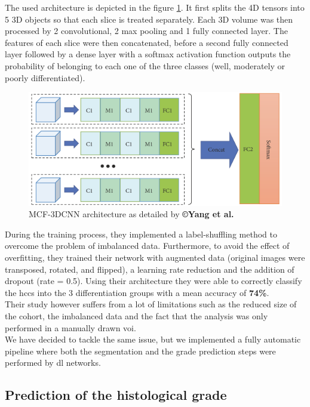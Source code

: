 The used architecture is depicted in the figure \ref{fig:Yang2019_Figure2_MCF-3DCNN}. It first splits the 4D
tensors into 5 3D objects so that each slice is treated separately. Each
3D volume was then processed by 2 convolutional, 2 max pooling and 1
fully connected layer. The features of each slice were then
concatenated, before a second fully connected layer followed by a dense
layer with a softmax activation function outputs the probability of
belonging to each one of the three classes (well, moderately or poorly differentiated).

\begin{figure}[th!]
\centering
\includegraphics[width=0.7\linewidth]{../HistologicalGradePrediction/images/Yang2019_Fig2}
\caption{MCF-3DCNN architecture as detailed by \textbf{©Yang et al. \cite{Yang2019}}}
\label{fig:Yang2019_Figure2_MCF-3DCNN}
\end{figure}


During the training process, they implemented a label-shuffling method
to overcome the problem of imbalanced data. Furthermore, to avoid the
effect of overfitting, they trained their network with augmented data
(original images were transposed, rotated, and flipped), a learning rate
reduction and the addition of dropout (rate = 0.5).
Using their architecture they were able to correctly classify the \ac{hcc}s
into the 3 differentiation groups with a mean accuracy of \textbf{74\%}.\\
Their study however suffers from a lot of limitations such as the
reduced size of the cohort, the imbalanced data and the fact that the
analysis was only performed in a manually drawn \ac{voi}.\\
We have decided to tackle the same issue, but we implemented a fully
automatic pipeline where both the segmentation and the grade prediction
steps were performed by \ac{dl} networks.


\subsection{Prediction of the histological grade}\label{prediction-of-the-histological-grade-on-tcia-db}

